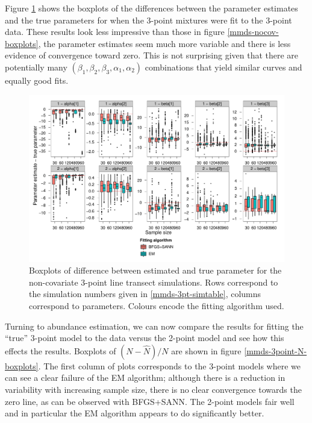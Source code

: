 Figure \ref{mmds-3point-boxplots} shows the boxplots of the differences between the parameter estimates and the true parameters for when the 3-point mixtures were fit to the 3-point data. These results look less impressive than those in figure \ref{mmds-nocov-boxplots}, the parameter estimates seem much more variable and there is less evidence of convergence toward zero. This is not surprising given that there are potentially many $(\beta_1, \beta_2, \beta_3, \alpha_1, \alpha_2)$ combinations that yield similar curves and equally good fits.

\begin{figure}
\centering
\includegraphics[width=7in]{mix/figs/3point-boxplots.pdf}
\caption{Boxplots of difference between estimated and true parameter for the non-covariate 3-point line transect simulations. Rows correspond to the simulation numbers given in \ref{mmds-3pt-simtable}, columns correspond to parameters. Colours encode the fitting algorithm used.}
\label{mmds-3point-boxplots}
\end{figure}

Turning to abundance estimation, we can now compare the results for fitting the ``true'' 3-point model to the data versus the 2-point model and see how this effects the results. Boxplots of $(N-\hat{N})/N$ are shown in figure \ref{mmds-3point-N-boxplots}. The first column of plots corresponds to the 3-point models where we can see a clear failure of the EM algorithm; although there is a reduction in variability with increasing sample size, there is no clear convergence towards the zero line, as can be observed with BFGS+SANN. The 2-point models fair well and in particular the EM algorithm appears to do significantly better. 

